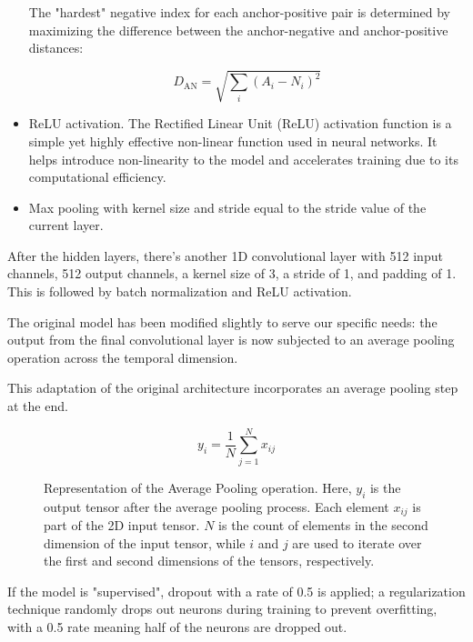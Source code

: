 \begin{itemize}
The "hardest" negative index for each anchor-positive pair is determined by maximizing the difference between the anchor-negative and anchor-positive distances:

\begin{equation}
D_{\text{AN}} = \sqrt{\sum_{i} (A_i - N_i)^2}
\end{equation}

    
\item ReLU activation. The Rectified Linear Unit (ReLU) activation function is a simple yet highly effective non-linear function used in neural networks. It helps introduce non-linearity to the model and accelerates training due to its computational efficiency.

    
\item Max pooling with kernel size and stride equal to the stride value of the current layer.
\end{itemize}

After the hidden layers, there's another 1D convolutional layer with 512 input channels, 512 output channels, a kernel size of 3, a stride of 1, and padding of 1. This is followed by batch normalization and ReLU activation.

The original model has been modified slightly to serve our specific needs: the output from the final convolutional layer is now subjected to an average pooling operation across the temporal dimension.

This adaptation of the original architecture incorporates an average pooling step at the end.

\begin{figure}[ht]
\centering
\begin{equation}
y_i = \frac{1}{N} \sum_{j=1}^{N} x_{ij}
\end{equation}
\caption[Average Pooling operation]{\small{Representation of the Average Pooling operation. Here, $y_i$ is the output tensor after the average pooling process. Each element $x_{ij}$ is part of the 2D input tensor. $N$ is the count of elements in the second dimension of the input tensor, while $i$ and $j$ are used to iterate over the first and second dimensions of the tensors, respectively.}}
\end{figure}


If the model is "supervised", dropout with a rate of 0.5 is applied; a regularization technique randomly drops out neurons during training to prevent overfitting, with a 0.5 rate meaning half of the neurons are dropped out.

